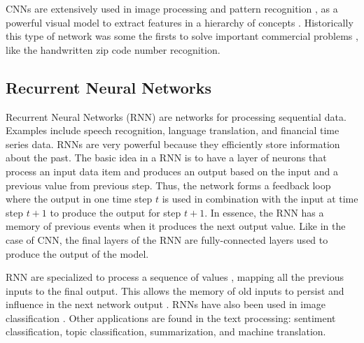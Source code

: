 \documentclass[12pt]{report}
\begin{document}
\ac{CNN}s are extensively used in image processing and pattern recognition \cite{Wang2014}, as a powerful visual model to extract features in a hierarchy of concepts \cite{Long2015}. Historically this type of network was some the firsts to solve important commercial problems \cite{Goodfellow2016}, like the handwritten zip code number recognition.

\subsection{Recurrent Neural Networks}
Recurrent Neural Networks (\ac{RNN}) are networks for processing sequential data. Examples include speech recognition, language translation, and financial time series data. \ac{RNN}s are very powerful because they  efficiently store information about the past. The basic idea in a RNN is to have 
a layer of neurons that process an input data item and produces an output based on the input and a previous value from previous step. Thus, the network forms a feedback loop where the output in one time step $t$ is used in combination with the input at time step $t+1$ to produce the output for step $t+1$. In essence, the \ac{RNN} has a memory of previous events when  it produces the next output value. Like in the case of \ac{CNN}, the 
final layers of the RNN are fully-connected layers used to produce the output of the model.

\ac{RNN} are specialized to process a sequence of values \cite{Goodfellow2016}, mapping all the previous inputs to the final output. This allows the memory of old inputs to persist and influence in the next network output \cite{Graves2017}. \ac{RNN}s have also been used in image classification 
\cite{Chandra2017}. Other applications are found in the text processing: sentiment classification, topic classification, summarization, and machine translation.

\end{document}
